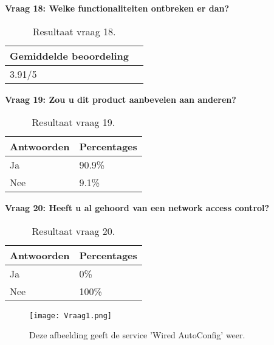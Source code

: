 \textbf{Vraag 18: Welke functionaliteiten ontbreken er dan?}
\begin{table}[H]
	\begin{center}
		\begin{tabular}{|l|l|}
			\hline
			\bf Gemiddelde beoordeling                                                                        \\ \hline
			3.91/5 \\ \hline                                                   
		\end{tabular}
		\caption{Resultaat vraag 18.}
	\end{center}
\end{table}

\textbf{Vraag 19: Zou u dit product aanbevelen aan anderen?}

\begin{table}[h!]
	\begin{center}
		\begin{tabular}{|l|l|}
					\hline
			\bf Antwoorden    & \bf Percentages \\ \hline
			Ja      & 90.9\% \\ \hline
			Nee     & 9.1\%    \\ \hline                                                                                                                           
		\end{tabular}
		\caption{Resultaat vraag 19.}
	\end{center}
\end{table}

\textbf{Vraag 20: Heeft u al gehoord van een network access control?}

\begin{table}[h!]
	\begin{center}
		\begin{tabular}{|l|l|}
		\hline
		\bf Antwoorden    & \bf Percentages \\ \hline
		Ja      & 0\% \\ \hline
		Nee     & 100\%    \\ \hline                                                      
		\end{tabular}
		\caption{Resultaat vraag 20.}
	\end{center}
\end{table}

\begin{figure}[H]
	\centering
	\texttt{[image: Vraag1.png]}
	\caption{Deze afbeelding geeft de service 'Wired AutoConfig' weer.}
\end{figure}

